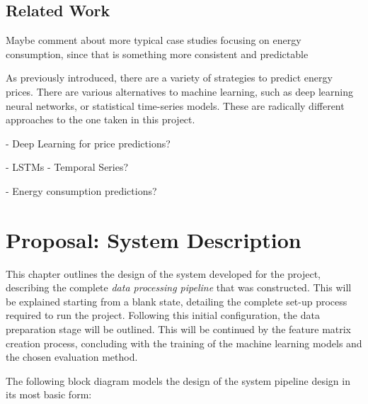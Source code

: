 \documentclass[12pt]{report} %
\begin{document}
\section{Related Work}

Maybe comment about more typical case studies focusing on energy consumption, since that is something more consistent and predictable

As previously introduced, there are a variety of strategies to predict energy prices. There are various alternatives to machine learning, such as deep learning neural networks, or statistical time-series models. These are radically different approaches to the one taken in this project.

- Deep Learning for price predictions?

- LSTMs - Temporal Series?

- Energy consumption predictions?





\chapter{Proposal: System Description}

This chapter outlines the design of the system developed for the project, describing the complete \textit{data processing pipeline} that was constructed. This will be explained starting from a blank state, detailing the complete set-up process required to run the project. Following this initial configuration, the data preparation stage will be outlined. This will be continued by the feature matrix creation process, concluding with the training of the machine learning models and the chosen evaluation method.

The following block diagram models the design of the system pipeline design in its most basic form:


\end{document}

